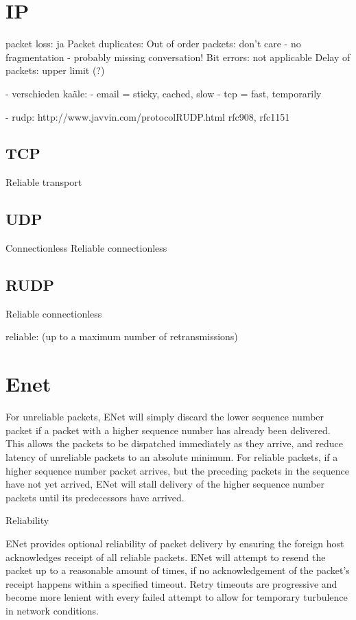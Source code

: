 \section{IP}

packet loss: ja
Packet duplicates:
Out of order packets: don't care - no fragmentation
    - probably missing conversation!
    Bit errors: not applicable
    Delay of packets: upper limit (?) 


    - verschieden kaäle:
        - email = sticky, cached, slow
            - tcp = fast, temporarily

            - rudp:
                http://www.javvin.com/protocolRUDP.html
                        rfc908, rfc1151

\subsection{TCP}
Reliable transport
\subsection{UDP}
Connectionless
Reliable connectionless\cite{rfc768}
\subsection{RUDP}
Reliable connectionless\cite{rfc908,rfc1151}

reliable: (up to a maximum number of retransmissions)
\section{Enet}

For unreliable packets, ENet will simply discard the lower sequence number packet if a packet with a higher sequence number has already been delivered. This allows the packets to be dispatched immediately as they arrive, and reduce latency of unreliable packets to an absolute minimum. For reliable packets, if a higher sequence number packet arrives, but the preceding packets in the sequence have not yet arrived, ENet will stall delivery of the higher sequence number packets until its predecessors have arrived.


Reliability

ENet provides optional reliability of packet delivery by ensuring the foreign host acknowledges receipt of all reliable packets. ENet will attempt to resend the packet up to a reasonable amount of times, if no acknowledgement of the packet's receipt happens within a specified timeout. Retry timeouts are progressive and become more lenient with every failed attempt to allow for temporary turbulence in network conditions.

